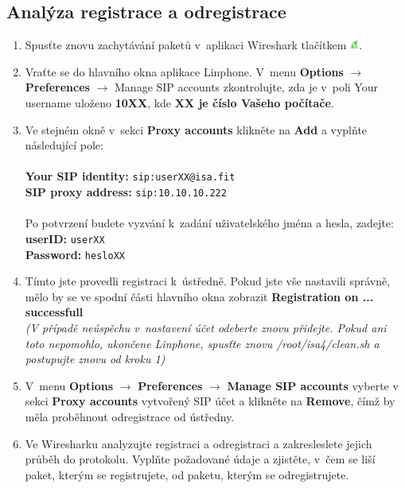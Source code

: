 \subsection{Analýza registrace a odregistrace}
\begin{enumerate}
    \item Spusťte znovu zachytávání paketů v aplikaci Wireshark tlačítkem \includegraphics[width=3mm]{img/ws_start.png}.
    \item Vraťte se do hlavního okna aplikace Linphone. V menu {\bf Options} $\rightarrow$ {\bf Preferences} {\bf $\rightarrow$} Manage SIP accounts zkontrolujte, zda je v poli Your username uloženo {\bf 10XX}, kde {\bf XX je číslo Vašeho počítače}.
    \item Ve stejném okně v sekci {\bf Proxy accounts} klikněte na {\bf Add} a vyplňte následující pole: \\
    ~\\
    {\bf Your SIP identity:} 	{\tt sip:userXX@isa.fit} \\
    {\bf SIP proxy address:}	{\tt sip:10.10.10.222} \\
    ~\\
	Po potvrzení budete vyzvání k zadání uživatelského jména a hesla, zadejte: \\
    {\bf userID:} 	{\tt userXX} \\
    {\bf Password:}	{\tt hesloXX}
    \item Tímto jste provedli registraci k ústředně. Pokud jste vše nastavili správně, mělo by se ve spodní části hlavního okna zobrazit {\bf Registration on ... successfull} \\
    {\it (V případě neúspěchu v nastavení účet odeberte znovu přidejte. Pokud ani toto nepomohlo, ukončene Linphone, spusťte znovu /root/isa4/clean.sh a postupujte znovu od kroku 1)}
    \item V menu {\bf Options} $\rightarrow$ {\bf Preferences} $\rightarrow$ {\bf Manage SIP accounts} vyberte v sekci {\bf Proxy accounts} vytvořený SIP účet a klikněte na {\bf Remove}, čímž by měla proběhnout odregistrace od ústředny.
    \item Ve Wiresharku analyzujte registraci a odregistraci a zakresleslete jejich průběh do protokolu. Vyplňte požadované údaje a zjistěte, v čem se liší paket, kterým se registrujete, od paketu, kterým se odregistrujete.
\end{enumerate}


